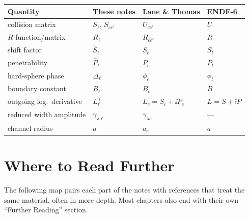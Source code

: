 \begin{center}
 {\small
 \begin{tabular}{llll}
  \toprule
   Quantity             & These notes              & Lane \& Thomas         & ENDF-6 \\
  \midrule
   collision matrix     & $S_\ell$, $S_{cc'}$      & $U_{cc'}$              & $U$ \\
   $R$-function/matrix  & $R_\ell$                 & $R_{cc'}$              & $R$ \\
   shift factor         & $\widehat{S}_\ell$       & $S_c$                  & $S_l$ \\
   penetrability        & $\widehat{P}_\ell$       & $P_c$                  & $P_l$ \\
   hard-sphere phase    & $\Delta_\ell$            & $\phi_c$            & $\phi_l$ \\
   boundary constant    & $B_\ell$                 & $B_c$                  & $B$ \\
   outgoing log.\ derivative & $L_\ell^+$          & $L_c = S_c + \ii P_c$  & $L = S + \ii P$ \\
   reduced width amplitude & $\gamma_{\lambda\ell}$ & $\gamma_{\lambda c}$  & --- \\
   channel radius       & $a$                      & $a_c$                  & $a$ \\
  \bottomrule
 \end{tabular}
 }
\end{center}

\section*{Where to Read Further}

The following map pairs each part of the notes with references that treat the same material, often in more depth.  Most chapters also end with their own ``Further Reading'' section.

